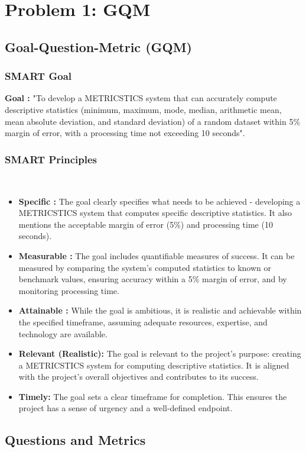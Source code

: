 \documentclass[12pt,letterpaper]{report}
\begin{document}
\chapter{Problem 1: GQM}
\section{Goal-Question-Metric (GQM)}
\subsection*{SMART Goal}
\item \textbf{Goal :} "To develop a METRICSTICS system that can accurately compute descriptive statistics (minimum, maximum, mode, median, arithmetic mean, mean absolute deviation, and standard deviation) of a random dataset within 5\% margin of error, with a processing time not exceeding 10 seconds".
\subsection*{SMART Principles}
\
\begin{itemize}
  \item \textbf{Specific :} The goal clearly specifies what needs to be achieved - developing a METRICSTICS system that computes specific descriptive statistics. It also mentions the acceptable margin of error (5\%) and processing time (10 seconds).
   \item \textbf{Measurable :} The goal includes quantifiable measures of success. It can be measured by comparing the system's computed statistics to known or benchmark values, ensuring accuracy within a 5\% margin of error, and by monitoring processing time.
   \item \textbf{Attainable :} While the goal is ambitious, it is realistic and achievable within the specified timeframe, assuming adequate resources, expertise, and technology are available.
   \item \textbf{Relevant (Realistic): } The goal is relevant to the project's purpose: creating a METRICSTICS system for computing descriptive statistics. It is aligned with the project's overall objectives and contributes to its success.
   \item \textbf{Timely: } The goal sets a clear timeframe for completion. This ensures the project has a sense of urgency and a well-defined endpoint.
\end{itemize}

\section{Questions and Metrics}
\end{document}
